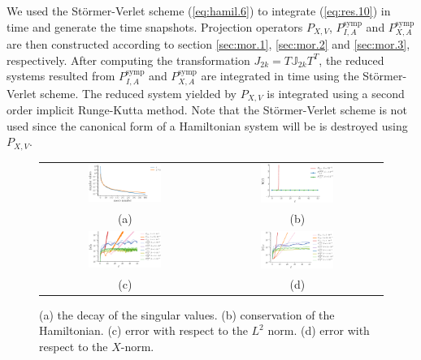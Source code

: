 We used the St\"ormer-Verlet scheme (\ref{eq:hamil.6}) to integrate (\ref{eq:res.10}) in time and generate the time snapshots. Projection operators $P_{X,V}$, $P^{\text{symp}}_{I,A}$ and $P^{\text{symp}}_{X,A}$ are then constructed according to section {\ref{sec:mor.1}}, {\ref{sec:mor.2}} and {\ref{sec:mor.3}}, respectively. After computing the transformation $J_{2k} = T \mathbb J_{2k} T^T$, the reduced systems resulted from $P^{\text{symp}}_{I,A}$ and $P^{\text{symp}}_{X,A}$ are integrated in time using the St\"ormer-Verlet scheme. The reduced system yielded by $P_{X,V}$ is integrated using a second order implicit Runge-Kutta method. Note that the St\"ormer-Verlet scheme is not used since the canonical form of a Hamiltonian system will be is destroyed using $P_{X,V}$.

\begin{figure} \label{fig:1}
\begin{tabular}{cc}
\includegraphics[width=0.45\textwidth]{./figs/beam/singulars} & \includegraphics[width=0.45\textwidth]{./figs/beam/energy} \\
(a) & (b) \\
\includegraphics[width=0.45\textwidth]{./figs/beam/l2_norm} & \includegraphics[width=0.45\textwidth]{./figs/beam/energy_norm} \\
(c) & (d) \\
\end{tabular}
\caption{(a) the decay of the singular values. (b) conservation of the Hamiltonian. (c) error with respect to the $L^2$ norm. (d) error with respect to the $X$-norm.}
\end{figure}

